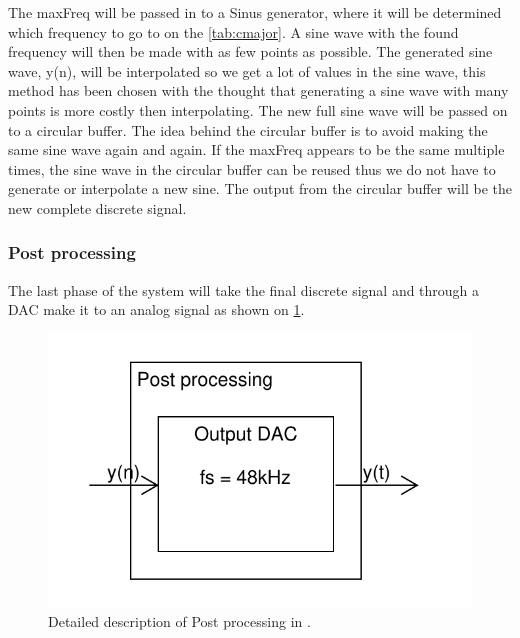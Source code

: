 The maxFreq will be passed in to a Sinus generator, where it will be determined which frequency to go to on the \cref{tab:cmajor}. A sine wave with the found frequency will then be made with as few points as possible. The generated sine wave, y(n), will be interpolated so we get a lot of values in the sine wave, this method has been chosen with the thought that generating a sine wave with many points is more costly then interpolating. The new full sine wave will be passed on to a circular buffer. The idea behind the circular buffer is to avoid making the same sine wave again and again. If the maxFreq appears to be the same multiple times, the sine wave in the circular buffer can be reused thus we do not have to generate or interpolate a new sine. The output from the circular buffer will be the new complete discrete signal.

\subsubsection{Post processing}
The last phase of the system will take the final discrete signal and through a DAC make it to an analog signal as shown on \cref{fig:DetailedPostPro}.
\begin{figure}
	\centering
	\includegraphics[width=1\linewidth]{gfx/Design/DesignPostPro_IF.pdf}
	\caption{Detailed description of Post processing in \systemName.}
	\label{fig:DetailedPostPro}
\end{figure}


